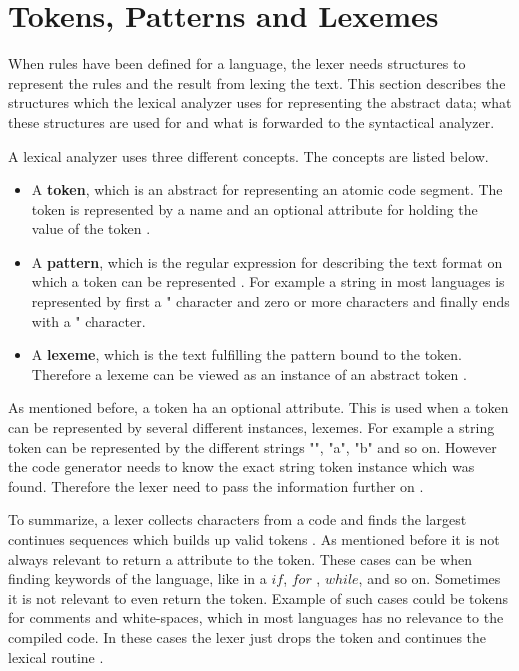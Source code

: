 \section{Tokens, Patterns and Lexemes}
When rules have been defined for a language, the lexer needs structures to
represent the rules and the result from lexing the text.
This section describes the structures which the lexical analyzer uses
for representing the abstract data; what these structures are used for and what is
forwarded to the syntactical analyzer.

A lexical analyzer uses three different concepts. The concepts are listed
below.
\begin{itemize}
  \item A \textbf{token}, which is an abstract for representing an atomic code
  segment. The token is represented by a name and an optional attribute for
  holding the value of the token \cite{Aho2006}.
  \item A \textbf{pattern}, which is the regular expression for describing the
  text format on which a token can be represented \cite{Aho2006}. For example a
  string in most languages is represented by first a " character and zero or 
  more characters and finally ends with a " character.
  \item A \textbf{lexeme}, which is the text fulfilling the pattern bound to 
  the token. Therefore a lexeme can be viewed as an instance of an abstract 
  token \cite{Aho2006}.
\end{itemize}
As mentioned before, a token ha an optional attribute. This is used when a 
token can be represented by several different instances, lexemes. For example a 
string token can be represented by the different strings "", "a", "b" and so 
on. However the code generator needs to know the exact string token instance 
which was found. Therefore the lexer need to pass the information further on \cite{Aho2006}.

To summarize, a lexer collects characters from a code and finds the largest 
continues sequences which builds up valid tokens \cite{sebesta2012}. As 
mentioned before it is not always relevant to return a attribute to the token. 
These cases can be when finding keywords of the language, like in a $if$, $for$
, $while$, and so on. Sometimes it is not relevant to even return the token. 
Example of such cases could be tokens for comments and white-spaces, which in 
most languages has no relevance to the compiled code. In these cases the lexer 
just drops the token and continues the lexical routine \cite{Aho2006}.

